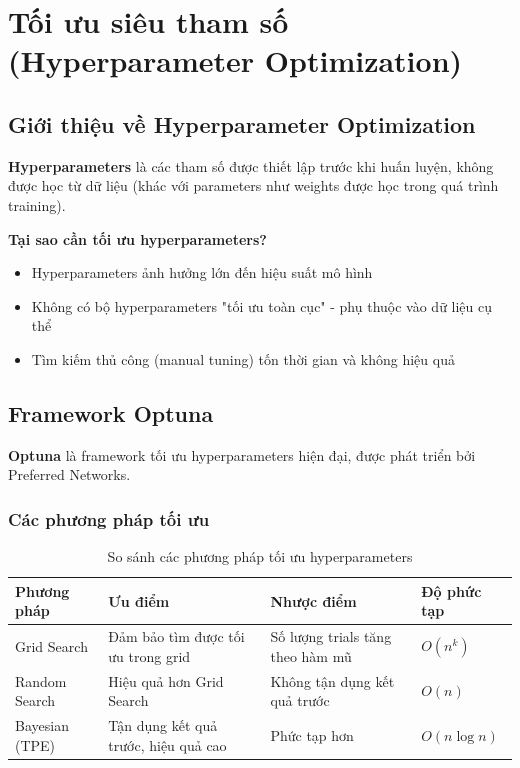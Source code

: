 \documentclass[12pt,a4paper]{article}
\begin{document}
\section{Tối ưu siêu tham số (Hyperparameter Optimization)}

\subsection{Giới thiệu về Hyperparameter Optimization}

\textbf{Hyperparameters} là các tham số được thiết lập trước khi huấn luyện, không được học từ dữ liệu (khác với parameters như weights được học trong quá trình training).

\textbf{Tại sao cần tối ưu hyperparameters?}
\begin{itemize}
    \item Hyperparameters ảnh hưởng lớn đến hiệu suất mô hình
    \item Không có bộ hyperparameters "tối ưu toàn cục" - phụ thuộc vào dữ liệu cụ thể
    \item Tìm kiếm thủ công (manual tuning) tốn thời gian và không hiệu quả
\end{itemize}

\subsection{Framework Optuna}

\textbf{Optuna} là framework tối ưu hyperparameters hiện đại, được phát triển bởi Preferred Networks.

\subsubsection{Các phương pháp tối ưu}

\begin{table}[H]
\centering
\caption{So sánh các phương pháp tối ưu hyperparameters}
\label{tab:optimization_methods}
\begin{tabular}{|l|p{4cm}|p{4cm}|p{3cm}|}
\hline
\textbf{Phương pháp} & \textbf{Ưu điểm} & \textbf{Nhược điểm} & \textbf{Độ phức tạp} \\
\hline
Grid Search & Đảm bảo tìm được tối ưu trong grid & Số lượng trials tăng theo hàm mũ & $O(n^k)$ \\
\hline
Random Search & Hiệu quả hơn Grid Search & Không tận dụng kết quả trước & $O(n)$ \\
\hline
Bayesian (TPE) & Tận dụng kết quả trước, hiệu quả cao & Phức tạp hơn & $O(n \log n)$ \\
\hline
\end{tabular}
\end{table}
\end{document}
